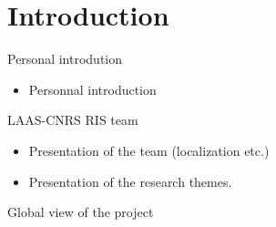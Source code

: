 \section{Introduction}
\begin{frame}{Personal introdution}
    \begin{itemize}
        \item Personnal introduction
    \end{itemize}
\end{frame}
\begin{frame}{LAAS-CNRS RIS team}
    \begin{itemize}
        \item Presentation of the team (localization etc.)
        \item Presentation of the research themes.
    \end{itemize}
\end{frame}
\begin{frame}{Global view of the project}
\end{frame}
